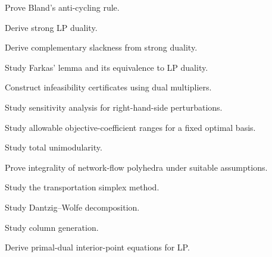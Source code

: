 \begin{exercise}[4]
Prove Bland's anti-cycling rule.
\end{exercise}

\begin{exercise}[4]
Derive strong LP duality.
\end{exercise}

\begin{exercise}[4]
Derive complementary slackness from strong duality.
\end{exercise}

\begin{exercise}[4]
Study Farkas' lemma and its equivalence to LP duality.
\end{exercise}

\begin{exercise}[4]
Construct infeasibility certificates using dual multipliers.
\end{exercise}

\begin{exercise}[4]
Study sensitivity analysis for right-hand-side perturbations.
\end{exercise}

\begin{exercise}[4]
Study allowable objective-coefficient ranges for a fixed optimal basis.
\end{exercise}

\begin{exercise}[4]
Study total unimodularity.
\end{exercise}

\begin{exercise}[4]
Prove integrality of network-flow polyhedra under suitable assumptions.
\end{exercise}

\begin{exercise}[4]
Study the transportation simplex method.
\end{exercise}

\begin{exercise}[4]
Study Dantzig--Wolfe decomposition.
\end{exercise}

\begin{exercise}[4]
Study column generation.
\end{exercise}

\begin{exercise}[4]
Derive primal-dual interior-point equations for LP.
\end{exercise}

